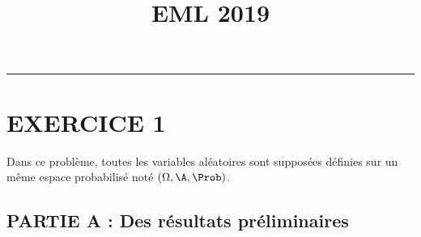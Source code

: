 \documentclass[11pt]{article}%
\title{\bf \vspace{-1.6cm} EML 2019} %
\author{} %
\date{} %
\begin{document}
\maketitle %
\vspace{-1.2cm}\hrule %
\thispagestyle{fancy}

\vspace*{-.2cm}


\section*{EXERCICE 1}

\noindent %
Dans ce problème, toutes les variables aléatoires sont supposées
définies sur un même espace probabilisé noté $(\Omega, \A, \Prob)$. %

\subsection*{PARTIE A : Des résultats préliminaires} %
\end{document}
